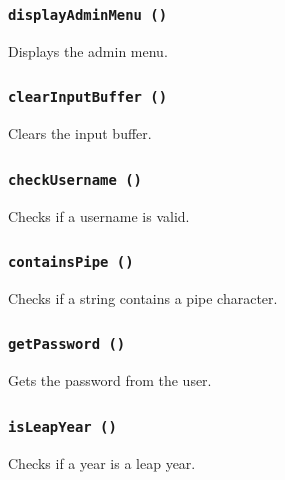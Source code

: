 \documentclass[12pt,a4paper]{report}
\begin{document}
\subsubsection{\texttt{displayAdminMenu ()}}
Displays the admin menu.


\subsubsection{\texttt{clearInputBuffer ()}}
Clears the input buffer.


\subsubsection{\texttt{checkUsername ()}}
Checks if a username is valid.


\subsubsection{\texttt{containsPipe ()}}
Checks if a string contains a pipe character.


\subsubsection{\texttt{getPassword ()}}
Gets the password from the user.


\subsubsection{\texttt{isLeapYear ()}}
Checks if a year is a leap year.

\end{document}
